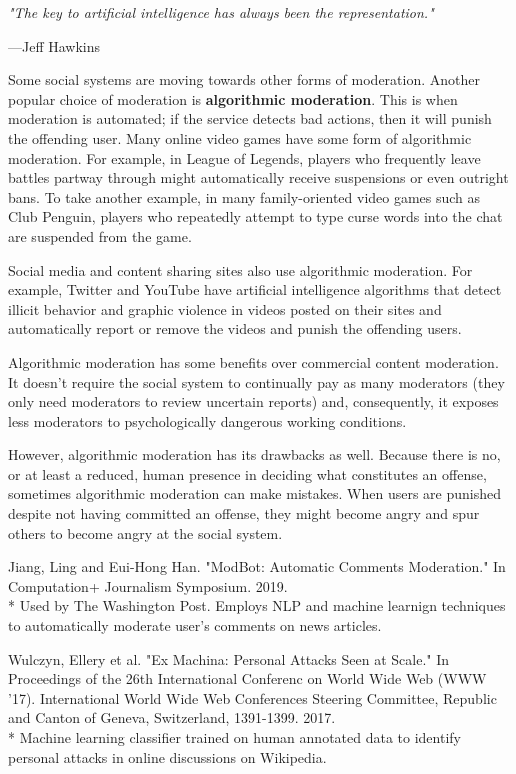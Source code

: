 \documentclass[class=book, crop=false]{standalone}
\providecommand{\keyterm}[1]{\textbf{#1}\marginnote{\scriptsize \textbf{#1}}}
\begin{document}
\epigraph{\itshape "The key to artificial intelligence has always been the representation."}{---Jeff Hawkins}

Some social systems are moving towards other forms of moderation. Another popular choice of moderation is \keyterm{algorithmic moderation}. This is when moderation is automated; if the service detects bad actions, then it will punish the offending user. Many online video games have some form of algorithmic moderation. For example, in League of Legends, players who frequently leave battles partway through might automatically receive suspensions or even outright bans. To take another example, in many family-oriented video games such as Club Penguin, players who repeatedly attempt to type curse words into the chat are suspended from the game.

Social media and content sharing sites also use algorithmic moderation. For example, Twitter and YouTube have artificial intelligence algorithms that detect illicit behavior and graphic violence in videos posted on their sites and automatically report or remove the videos and punish the offending users.

Algorithmic moderation has some benefits over commercial content moderation. It doesn't require the social system to continually pay as many moderators (they only need moderators to review uncertain reports) and, consequently, it exposes less moderators to psychologically dangerous working conditions.

However, algorithmic moderation has its drawbacks as well. Because there is no, or at least a reduced, human presence in deciding what constitutes an offense, sometimes algorithmic moderation can make mistakes. When users are punished despite not having committed an offense, they might become angry and spur others to become angry at the social system.

Jiang, Ling and Eui-Hong Han. "ModBot: Automatic Comments Moderation." In Computation+ Journalism Symposium. 2019.\\
* Used by The Washington Post. Employs NLP and machine learnign techniques to automatically moderate user's comments on news articles.

Wulczyn, Ellery et al. "Ex Machina: Personal Attacks Seen at Scale." In Proceedings of the 26th International Conferenc on World Wide Web (WWW '17). International World Wide Web Conferences Steering Committee, Republic and Canton of Geneva, Switzerland, 1391-1399. 2017.\\
* Machine learning classifier trained on human annotated data to identify personal attacks in online discussions on Wikipedia.
\end{document}
